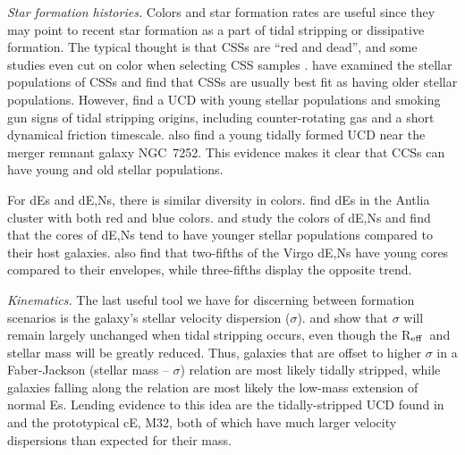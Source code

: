 \documentclass[iop,apj]{emulateapj}
\newcommand{\Reff}{R$_{\rm eff}$}
\begin{document}
\textit{Star formation histories.} 
Colors and star formation rates are useful since they may point to recent star formation as a part of tidal stripping or dissipative formation. The typical thought is that CSSs are ``red and dead'', and some studies even cut on color when selecting CSS samples \citep{Chilingarian2015}. \citet{Drinkwater2000} have examined the stellar populations of CSSs and find that CSSs are usually best fit as having older stellar populations. However, \citet{Norris2011} find a UCD with young stellar populations and smoking gun signs of tidal stripping origins, including counter-rotating gas and a short dynamical friction timescale. \citet{Maraston2004} also find a young tidally formed UCD near the merger remnant galaxy NGC~7252. This evidence makes it clear that CCSs can have young and old stellar populations.

For dEs and dE,Ns, there is similar diversity in colors. \citet{SmithCastelli2012} find dEs in the Antlia cluster with both red and blue colors. \citet{Drinkwater2000} and \citet{Ferrarese2006} study the colors of dE,Ns and find that the cores of dE,Ns tend to have younger stellar populations compared to their host galaxies. \cite{Grant2005} also find that two-fifths of the Virgo dE,Ns have young cores compared to their envelopes, while three-fifths display the opposite trend. 

\textit{Kinematics.}  The last useful tool we have for discerning between formation scenarios is the galaxy's stellar velocity dispersion ($\sigma$). \citet{Bender1992} and \citet{Bekki2003} show that $\sigma$ will remain largely unchanged when tidal stripping occurs, even though the \Reff\ and stellar mass will be greatly reduced. Thus, galaxies that are offset to higher $\sigma$ in a Faber-Jackson (stellar mass -- $\sigma$) relation \citep{faber1976} are most likely tidally stripped, while galaxies falling along the relation are most likely the low-mass extension of normal Es. Lending evidence to this idea are the tidally-stripped UCD found in \citet{Maraston2004} and the prototypical cE, M32, both of which have much larger velocity dispersions than expected for their mass.
\end{document}
